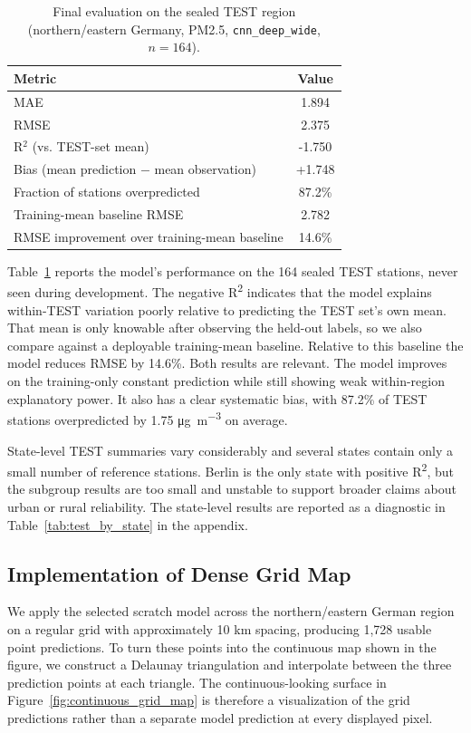 \documentclass[english, a4paper]{article}
\begin{document}
\begin{table}[ht]
\centering
\caption{Final evaluation on the sealed TEST region (northern/eastern Germany, PM2.5, \texttt{cnn\_deep\_wide}, $n=164$).}
\label{tab:test_summary}
\begin{tabular}{lc}
\hline
\textbf{Metric} & \textbf{Value} \\
\hline
MAE & 1.894 \\
RMSE & 2.375 \\
R$^2$ (vs. TEST-set mean) & -1.750 \\
Bias (mean prediction $-$ mean observation) & +1.748 \\
Fraction of stations overpredicted & 87.2\% \\
Training-mean baseline RMSE & 2.782 \\
RMSE improvement over training-mean baseline & 14.6\% \\
\hline
\end{tabular}
\end{table}

Table~\ref{tab:test_summary} reports the model's performance on the 164 sealed TEST stations, never seen during development. The negative R\textsuperscript{2} indicates that the model explains within-TEST variation poorly relative to predicting the TEST set's own mean. That mean is only knowable after observing the held-out labels, so we also compare against a deployable training-mean baseline. Relative to this baseline the model reduces RMSE by 14.6\%. Both results are relevant. The model improves on the training-only constant prediction while still showing weak within-region explanatory power. It also has a clear systematic bias, with 87.2\% of TEST stations overpredicted by 1.75 \si{\micro\gram\per\cubic\meter} on average.

State-level TEST summaries vary considerably and several states contain only a small number of reference stations. Berlin is the only state with positive R\textsuperscript{2}, but the subgroup results are too small and unstable to support broader claims about urban or rural reliability. The state-level results are reported as a diagnostic in Table~\ref{tab:test_by_state} in the appendix.

\subsection{Implementation of Dense Grid Map}

We apply the selected scratch model across the northern/eastern German region on a regular grid with approximately 10 km spacing, producing 1,728 usable point predictions. To turn these points into the continuous map shown in the figure, we construct a Delaunay triangulation and interpolate between the three prediction points at each triangle. The continuous-looking surface in Figure~\ref{fig:continuous_grid_map} is therefore a visualization of the grid predictions rather than a separate model prediction at every displayed pixel.
\end{document}
